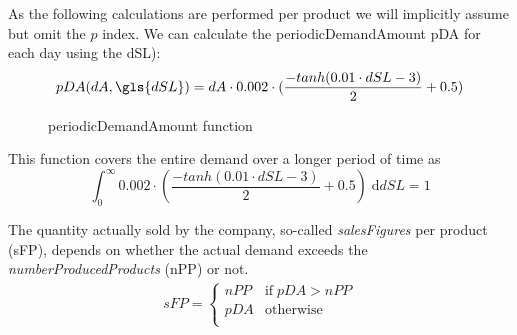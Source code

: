 As the following calculations are performed per product we will implicitly assume but omit the $p$ index.
We can calculate the periodicDemandAmount \gls{pDA} for each day using the \gls{dSL}):
\begin{equation}
\begin{aligned}
pDA(dA, \gls{dSL}) = dA \cdot 0.002\cdot (\frac{-tanh(0.01 \cdot dSL-3)}{2} + 0.5)
\end{aligned}
\end{equation}

\begin{figure}[h]
\centering
{}
	\caption{periodicDemandAmount function}
	\label{periodicDemandAmount_function}
\end{figure}


This function covers the entire demand over a longer period of time as
\begin{equation}
	\int_{0}^{\infty} 0.002 \cdot (\frac{-tanh(0.01 \cdot dSL-3)}{2} + 0.5)\; \mathrm{d} dSL = 1  
\end{equation}

The quantity actually sold by the company, so-called \textit{salesFigures} per product (\gls{sFP}), depends on whether the actual demand exceeds the \textit{numberProducedProducts} (\gls{nPP}) or not.
\begin{equation}
\label{func:salesFigure}
\begin{aligned}
sFP = 
\begin{cases}
     nPP & \text{if} \; pDA > nPP\\
     pDA & \text{otherwise} \\
\end{cases}
\end{aligned}
\end{equation}

